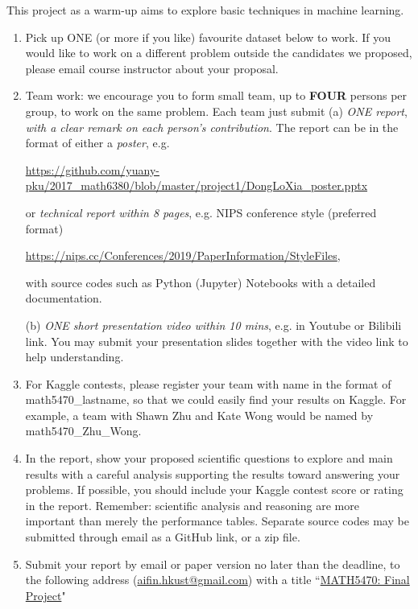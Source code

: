 \documentclass[11pt]{article}
\begin{document}
This project as a warm-up aims to explore basic techniques in machine learning.
\begin{enumerate}
\item Pick up ONE (or more if you like) favourite dataset below to work. If you would like to work on a different problem outside the candidates we proposed, please email course instructor about your proposal.  
\item Team work: we encourage you to form small team, up to {\bf FOUR} persons per group, to work on the same problem. Each team just submit 
\subitem(a) \emph{ONE report}, \emph{with a clear remark on each person's contribution}. The report can be in the format of either a \emph{poster}, e.g. 
\begin{center}%
\url{https://github.com/yuany-pku/2017_math6380/blob/master/project1/DongLoXia_poster.pptx}
\end{center}
or \emph{technical report within 8 pages}, e.g. NIPS conference style (preferred format) 
\begin{center}
\url{https://nips.cc/Conferences/2019/PaperInformation/StyleFiles}, 
\end{center}
with source codes such as Python (Jupyter) Notebooks with a detailed documentation.

\subitem(b) \emph{ONE short presentation video within 10 mins}, e.g. in Youtube or Bilibili link. You may submit your presentation slides together with the video link to help understanding. 

\item For Kaggle contests, please register your team with name in the format of math5470\_lastname, so that we could easily find your results on Kaggle. For example, a team with Shawn Zhu and Kate Wong would be named by math5470\_Zhu\_Wong.

\item In the report, show your proposed scientific questions to explore and main results with a careful analysis supporting the results toward answering your problems. If possible, you should include your Kaggle contest score or rating in the report. Remember: scientific analysis and reasoning are more important than merely the performance tables. Separate source codes may be submitted through email as a GitHub link, or a zip file.    
\item Submit your report by email or paper version no later than the deadline, to the following address  (\href{mailto:aifin.hkust@gmail.com}{aifin.hkust@gmail.com}) with a title ``\underline{MATH5470: Final Project}" %


\end{enumerate}
\end{document}
